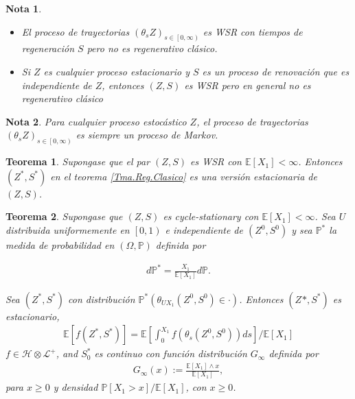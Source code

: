 \documentclass{article}
\newtheorem{Teo}{Teorema}%
\newtheorem{Note}{Nota}%
\newcommand{\esp}{\mathbb{E}}
\newcommand{\prob}{\mathbb{P}}
\numberwithin{equation}{section}
\begin{document}
\begin{Note}
\begin{itemize}
\item El proceso de trayectorias $\left(\theta_{s}Z\right)_{s\in\left[0,\infty\right)}$ es WSR con tiempos de regeneraci\'on $S$ pero no es regenerativo cl\'asico.
\item Si $Z$ es cualquier proceso estacionario y $S$ es un proceso de renovaci\'on que es independiente de $Z$, entonces $\left(Z,S\right)$ es WSR pero en general no es regenerativo cl\'asico
\end{itemize}
\end{Note}


\begin{Note}
Para cualquier proceso estoc\'astico $Z$, el proceso de trayectorias $\left(\theta_{s}Z\right)_{s\in\left[0,\infty\right)}$ es siempre un proceso de Markov.
\end{Note}

\begin{Teo}
Supongase que el par $\left(Z,S\right)$ es WSR con $\esp\left[X_{1}\right]<\infty$. Entonces $\left(Z^{*},S^{*}\right)$ en el teorema \ref{Tma.Reg.Clasico} es una versi\'on estacionaria de  $\left(Z,S\right)$.
\end{Teo}


\begin{Teo}
Supongase que $\left(Z,S\right)$ es cycle-stationary con $\esp\left[X_{1}\right]<\infty$. Sea $U$ distribuida uniformemente en $\left[0,1\right)$ e independiente de $\left(Z^{0},S^{0}\right)$ y sea $\prob^{*}$ la medida de probabilidad en $\left(\Omega,\prob\right)$ definida por 

\begin{eqnarray}d\prob^{*}=\frac{X_{1}}{\esp\left[X_{1}\right]}d\prob.\end{eqnarray} 

Sea $\left(Z^{*},S^{*}\right)$ con distribuci\'on $\prob^{*}\left(\theta_{UX_{1}}\left(Z^{0},S^{0}\right)\in\cdot\right)$. Entonces $\left(Z^{}*,S^{*}\right)$ es estacionario,
\begin{eqnarray}
\esp\left[f\left(Z^{*},S^{*}\right)\right]=\esp\left[\int_{0}^{X_{1}}f\left(\theta_{s}\left(Z^{0},S^{0}\right)\right)ds\right]/\esp\left[X_{1}\right]
\end{eqnarray}
$f\in\mathcal{H}\otimes\mathcal{L}^{+}$, and $S_{0}^{*}$ es continuo con funci\'on distribuci\'on $G_{\infty}$ definida por 
\begin{eqnarray}
G_{\infty}\left(x\right):=\frac{\esp\left[X_{1}\right]\wedge x}{\esp\left[X_{1}\right]},
\end{eqnarray}
para $x\geq0$ y densidad $\prob\left[X_{1}>x\right]/\esp\left[X_{1}\right]$, con $x\geq0$.
\end{Teo}
\end{document}
